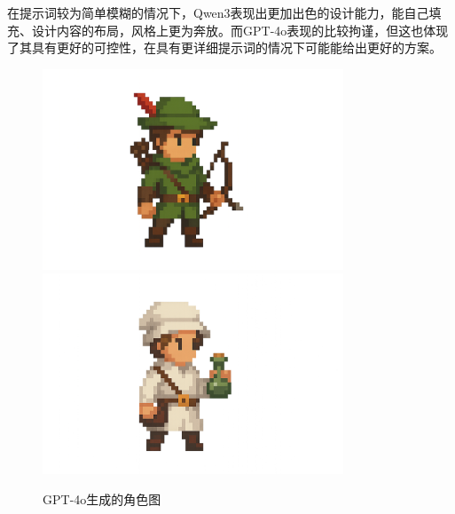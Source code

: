 \documentclass[12pt]{article}
\begin{document}
在提示词较为简单模糊的情况下，Qwen3表现出更加出色的设计能力，能自己填充、设计内容的布局，风格上更为奔放。而GPT-4o表现的比较拘谨，但这也体现了其具有更好的可控性，在具有更详细提示词的情况下可能能给出更好的方案。
\begin{figure}[H]
    \centering
    \includegraphics[width=0.8\textwidth]{youxia.png}
    \includegraphics[width=0.8\textwidth]{lianjin.png}
    \caption{GPT-4o生成的角色图}
    \label{fig:gpt4o-image}
\end{figure}
\end{document}
